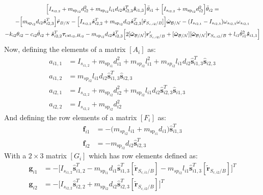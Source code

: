 \documentclass[paper]{aiaaNew}
\begin{document}
\begin{multline}
 \Big[I_{s_{i2,2}} + m_{\text{sp}_{i2}} d_{i2}^2 + m_{\text{sp}_{i2}} l_{i1} d_{i2} \hat{\bm s}_{i2,3}^T \bm{\hat{s}}_{i1,3} \Big] \ddot\theta_{i1} 
+ \Big[I_{s_{i2,2}} + m_{\text{sp}_{i2}} d_{i2}^2 \Big] \ddot\theta_{i2} 
= \\
-\Big[m_{\text{sp}_{i2}} d_{i2} \hat{\bm s}_{i2,3}^T\Big] \ddot{\bm{r}}_{B/N} - \Big[I_{s_{i2,2}} \hat{\bm s}_{i2,2}^T + m_{\text{sp}_{i2}} d_{i2} \hat{\bm s}_{i2,3}^T [\tilde{\bm{r}}_{S_{c,i2}/B}]\Big] \dot{\bm\omega}_{\cal B/N} - (I_{s_{i2,1}} - I_{s_{i2,3}}) \omega_{s_{i2,3}} \omega_{s_{i2,1}} \\
- k_{i2} \theta_{i2} - c_{i2} \dot{\theta}_{i2} + \hat{\bm s}_{i2,2}^T \bm \tau_{\text{ext}_{i2},H_{i2}}  
-  m_{\text{sp}_{i2}} d_{i2} \hat{\bm s}_{i2,3}^T \Big[ 2 [\tilde{\bm\omega}_{\cal B/N}] \bm{r}'_{S_{c,i2}/B} + [\tilde{\bm\omega}_{\cal B/N}] [\tilde{\bm\omega}_{\cal B/N}] \bm{r}_{S_{c,i2}/B} + l_{i1} \dot{\theta}_{i1}^2 \bm{\hat{s}}_{i1,1} \Big]
\label{eq:sp3final}
\end{multline}
Now, defining the elements of a matrix $[A_i]$ as:
\begin{subequations}
	\begin{align}
	a_{i1,1} &= I_{s_{i1,2}} + m_{\text{sp}_{i1}} d^2_{i1} + m_{sp_{i2}} l^2_{i1}+ m_{sp_{i2}} l_{i1} d_{i2}\hat{\bm s}^T_{i1,3}  \bm{\hat{s}}_{i2,3} \\
	a_{i1,2} &= m_{sp_{i2}} l_{i1} d_{i2} \hat{\bm s}^T_{i1,3}  \bm{\hat{s}}_{i2,3}\\
	a_{i2,1} &= I_{s_{i2,2}} + m_{\text{sp}_{i2}} d^2_{i2}  +  m_{\text{sp}_{i2}} l_{i1} d_{i2}\hat{\bm s}^T_{i2,3}  \bm{\hat{s}}_{i1,3} \\
	a_{i2,2} &= I_{s_{i2,2}} +  m_{\text{sp}_{i2}} d^2_{i2}
	\end{align}
\end{subequations}
And defining the row elements of a matrix $[F_i]$ as:
\begin{subequations}
	\begin{align}
	\bm f_{i1} &= -\big(m_{sp_{i2}} l_{i1} + m_{\text{sp}_{i1}} d_{i1} \big) \hat{\bm s}^T_{i1,3}\\
	\bm f_{i2} &= -m_{\text{sp}_{i2}} d_{i2} \hat{\bm s}_{i2,3}^T
	\end{align}
\end{subequations}
With a $2\times 3$ matrix $[G_i]$ which has row elements defined as:
\begin{subequations}
	\begin{align}
	\bm g_{i1} &= - \Big[I_{s_{i1,2}} \hat{\bm s}_{i1,2}^T - m_{\text{sp}_{i1}} d_{i1} \hat{\bm s}_{i1,3}^T [\tilde{\bm{r}}_{S_{c,i1}/B}] - m_{sp_{i2}} l_{i1} \hat{\bm s}_{i1,3}^T [\tilde{\bm{r}}_{S_{c,i2}/B}] \Big]^T\\
	\bm g_{i2} &= -  \Big[I_{s_{i2,2}} \hat{\bm s}_{i2,2}^T + m_{\text{sp}_{i2}} d_{i2} \hat{\bm s}_{i2,3}^T [\tilde{\bm{r}}_{S_{c,i2}/B}]\Big]^T
	\end{align}
\end{subequations}
\end{document}
